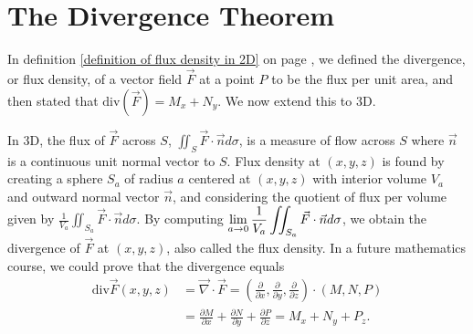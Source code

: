 \section{The Divergence Theorem}


In definition \ref{definition of flux density in 2D} on page \pageref{definition of flux density in 2D}, we defined the divergence, or flux density, of a vector field $\vec F$ at a point $P$ to be the flux per unit area, and then stated that $\text{div}(\vec F)=M_x+N_y$. We now extend this to 3D.

In 3D, the flux of $\vec F$ across $S$, $\iint_S\vec F\cdot \vec n d\sigma$, is a measure of flow across $S$ where $\vec n$ is a continuous unit normal vector to $S$.  Flux density at $(x,y,z)$ is found by creating a sphere $S_a$ of radius $a$ centered at $(x,y,z)$ with interior volume $V_a$ and outward normal vector $\vec n$, and considering the quotient of flux per volume given by $\frac{1}{V_a}\iint_{S_a} \vec F \cdot \vec n d\sigma$. By computing $\displaystyle \lim_{a\to 0}\frac{1}{V_a}\iint_{S_a} \vec F \cdot \vec n d\sigma$, we obtain the divergence of $\vec F$ at $(x,y,z)$, also called the flux density. In a future mathematics course, we could prove that the divergence equals
\begin{align*}
\text{div}\vec F(x,y,z) 
&= \vec \nabla\cdot \vec F 
= \left(\frac{\partial }{\partial x},\frac{\partial }{\partial y},\frac{\partial }{\partial z} \right)\cdot (M,N,P) \\
&= \frac{\partial M}{\partial x}+\frac{\partial N}{\partial y}+\frac{\partial P}{\partial z} 
= M_x+N_y+P_z 
.
\end{align*}


